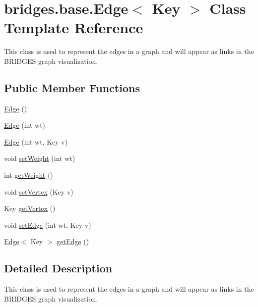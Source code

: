 \hypertarget{classbridges_1_1base_1_1_edge}{}\section{bridges.\+base.\+Edge$<$ Key $>$ Class Template Reference}
\label{classbridges_1_1base_1_1_edge}


This class is used to represent the edges in a graph and will appear as links in the B\+R\+I\+D\+G\+ES graph visualization.  


\subsection*{Public Member Functions}
\begin{DoxyCompactItemize}
\item 
\hyperlink{classbridges_1_1base_1_1_edge_ac070f05141bfbc7c575591e59d508476}{Edge} ()
\item 
\hyperlink{classbridges_1_1base_1_1_edge_a8567ee2a3d4d655f0a2a2258767238d6}{Edge} (int wt)
\item 
\hyperlink{classbridges_1_1base_1_1_edge_a503c093e63f5df1071233427496d9d08}{Edge} (int wt, Key v)
\item 
void \hyperlink{classbridges_1_1base_1_1_edge_a5b671fc2589d95b125b0b2cedbab0f1a}{set\+Weight} (int wt)
\item 
int \hyperlink{classbridges_1_1base_1_1_edge_a4cc9219e5842cafb7c5891ba15147ec1}{get\+Weight} ()
\item 
void \hyperlink{classbridges_1_1base_1_1_edge_a596d119b0bcfe8c455acae65832bf25d}{set\+Vertex} (Key v)
\item 
Key \hyperlink{classbridges_1_1base_1_1_edge_ada8056d4944cfea69f438af8274c1f79}{get\+Vertex} ()
\item 
void \hyperlink{classbridges_1_1base_1_1_edge_a02f0ad2a38fff319ccc8e9619f7db7f9}{set\+Edge} (int wt, Key v)
\item 
\hyperlink{classbridges_1_1base_1_1_edge}{Edge}$<$ Key $>$ \hyperlink{classbridges_1_1base_1_1_edge_a666bb076c206e572d9fca072b58db162}{get\+Edge} ()
\end{DoxyCompactItemize}


\subsection{Detailed Description}
This class is used to represent the edges in a graph and will appear as links in the B\+R\+I\+D\+G\+ES graph visualization. 

